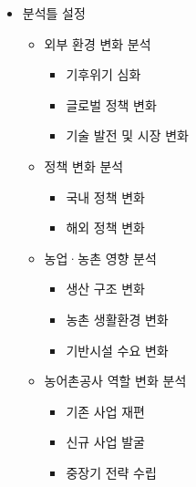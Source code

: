 \documentclass[11pt,a4paper]{article}
\begin{document}
\begin{itemize}
    \item 분석틀 설정
    \begin{itemize}
        \item 외부 환경 변화 분석
        \begin{itemize}
            \item 기후위기 심화
            \item 글로벌 정책 변화
            \item 기술 발전 및 시장 변화
        \end{itemize}
        \item 정책 변화 분석
        \begin{itemize}
            \item 국내 정책 변화
            \item 해외 정책 변화
        \end{itemize}
        \item 농업·농촌 영향 분석
        \begin{itemize}
            \item 생산 구조 변화
            \item 농촌 생활환경 변화
            \item 기반시설 수요 변화
        \end{itemize}
        \item 농어촌공사 역할 변화 분석
        \begin{itemize}
            \item 기존 사업 재편
            \item 신규 사업 발굴
            \item 중장기 전략 수립
        \end{itemize}
    \end{itemize}


\end{itemize}
\end{document}

